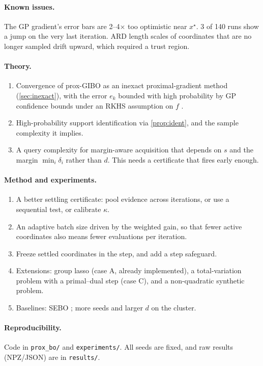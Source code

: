 \documentclass[10pt]{article}
\theoremstyle{remark}
\begin{document}
\paragraph{Known issues.} The GP gradient's error bars are 2--4$\times$ too optimistic near $x^\star$. 3 of 140 runs show a jump on the very last
iteration. ARD length scales of coordinates that are no longer sampled drift upward, which required a trust region.

\paragraph{Theory.}
\begin{enumerate}[label=(T\arabic*)]
\item Convergence of prox-GIBO as an inexact proximal-gradient method (\cref{sec:inexact}), with the error $e_k$ bounded with high probability by
GP confidence bounds under an RKHS assumption on $f$ \citep{srinivas2010ucb}.
\item High-probability support identification via \cref{prop:ident}, and the sample complexity it implies.
\item A query complexity for margin-aware acquisition that depends on $s$ and the margin $\min_i\delta_i$ rather than $d$. This needs a
certificate that fires early enough.
\end{enumerate}

\paragraph{Method and experiments.}
\begin{enumerate}[label=(M\arabic*)]
\item A better settling certificate: pool evidence across iterations, or use a sequential test, or calibrate $\kappa$.
\item An adaptive batch size driven by the weighted gain, so that fewer active coordinates also means fewer evaluations per iteration.
\item Freeze settled coordinates in the step, and add a step safeguard.
\item Extensions: group lasso (case A, already implemented), a total-variation problem with a primal--dual step (case C), and a non-quadratic
synthetic problem.
\item Baselines: SEBO \citep{liu2023sebo}; more seeds and larger $d$ on the cluster.
\end{enumerate}

\paragraph{Reproducibility.} Code in \texttt{prox\_bo/} and \texttt{experiments/}. All seeds are fixed, and raw results (NPZ/JSON) are in \texttt{results/}.



\end{document}
